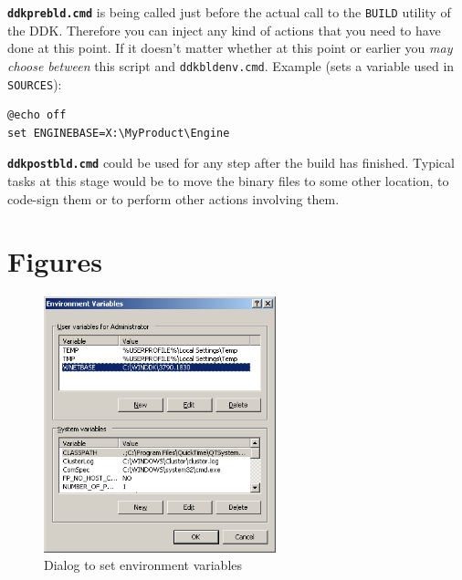 \documentclass[a4paper,titlepage]{report}
\begin{document}
\textbf{\texttt{ddkprebld.cmd}} is being called just before the actual call to the \texttt{BUILD}
utility of the DDK. Therefore you can inject any kind of actions that you need to have done at this
point. If it doesn't matter whether at this point or earlier you \emph{may choose between} this script
and \texttt{ddkbldenv.cmd}. Example (sets a variable used in \texttt{SOURCES}):

\begin{verbatim}
@echo off
set ENGINEBASE=X:\MyProduct\Engine
\end{verbatim}

\textbf{\texttt{ddkpostbld.cmd}} could be used for any step after the build has finished. Typical
tasks at this stage would be to move the binary files to some other location, to code-sign
them or to perform other actions involving them.

\chapter{Figures}\thispagestyle{fancy}

\begin{figure}[h]
    \centering
    \caption{Dialog to set environment variables\label{fig:EnvironmentVariables}}
    \includegraphics[width=0.6\textwidth]{./EnvironmentVars.png}
\end{figure}
\end{document}
